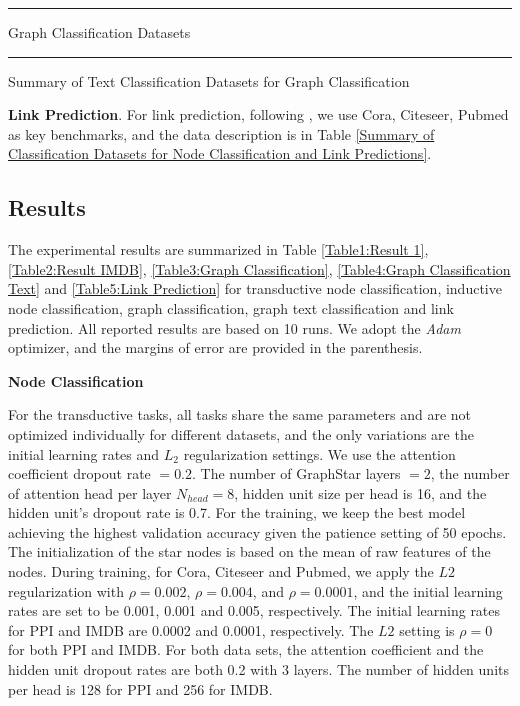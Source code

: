 \documentclass{article}
\begin{document}
\begin{table}[!ht]
\centering
{}
\rule{\linewidth}{0cm}
\caption{\label{Table3:Graph Classification Datasets} Graph Classification Datasets}
\end{table}
\vspace*{-\baselineskip}

\begin{table}[!ht]
\centering
{}
\rule{\linewidth}{0cm}
\caption{\label{Table2:Graph Text Classification Datasets}Summary of Text Classification Datasets for Graph Classification}
\end{table}


\textbf{Link Prediction}. For link prediction, following \cite{DBLP:journals/corr/abs-1811-02798}, we use Cora, Citeseer, Pubmed as key benchmarks, and the data description is in Table \ref{Summary of Classification Datasets for Node Classification and Link Predictions}.



\subsection{Results}

The experimental results are summarized in Table \ref{Table1:Result 1}, \ref{Table2:Result IMDB}, \ref{Table3:Graph Classification}, \ref{Table4:Graph Classification Text} and \ref{Table5:Link Prediction} for transductive node classification, inductive node classification, graph classification, graph text classification and link prediction. All reported results are based on 10 runs. We adopt the \textit{Adam} optimizer, and the margins of error are provided in the parenthesis.

\textbf{Node Classification}

For the transductive tasks, all tasks share the same parameters and are not optimized individually for different datasets, and the only variations are the initial learning rates and \(L_2\) regularization settings. We use the attention coefficient dropout rate \(= 0.2\). The number of GraphStar layers \(=2\), the number of attention head per layer \(N_{head}=8\), hidden unit size per head is 16, and the hidden unit's dropout rate is 0.7. For the training, we keep the best model achieving the highest validation accuracy given the patience setting of 50 epochs. The initialization of the star nodes is based on the mean of raw features of the nodes. During training, for Cora, Citeseer and Pubmed, we apply the \(L2\) regularization with \(\rho = 0.002\), \(\rho = 0.004\), and \(\rho = 0.0001\), and the initial learning rates are set to be 0.001, 0.001 and 0.005, respectively. The initial learning rates for PPI and IMDB are 0.0002 and 0.0001, respectively. The \(L2\) setting is \(\rho = 0\) for both PPI and IMDB. For both data sets, the attention coefficient and the hidden unit dropout rates are both 0.2 with 3 layers. The number of hidden units per head is 128 for PPI and 256 for IMDB.
\end{document}
